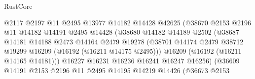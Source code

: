 \begin{lexlean}{RustCore}
\begin{coremodule}
                                      @2117
                                      @2197
                                      @11
                                      @2495
                                      @13977
                                      @14182
                                      @14428
                                      @42625
                                      (@38670
                                        @2153
                                        @2196
                                        @11
                                        @14182
                                        @14191
                                        @2495
                                        @14428
                                        (@38680
                                          @14182
                                          @14189
                                          @2502
                                          (@38687
                                            @14181
                                            @14188
                                            @2473
                                            @14164
                                            @2479
                                            @19278
                                            (@38701
                                              @14174
                                              @2479
                                              @38712
                                              @19299
                                              @16209
                                              (@16192 (@16211 @14175 @2495)))
                                            @16209
                                            (@16192 (@16211 @14165 @14181)))
                                          @16227
                                          @16231
                                          @16236
                                          @16241
                                          @16247
                                          @16256)
                                        (@36609
                                          @14191
                                          @2153
                                          @2196
                                          @11
                                          @2495
                                          @14195
                                          @14219
                                          @14426
                                          (@36673
                                            @2153

\end{coremodule}
\end{lexlean}
